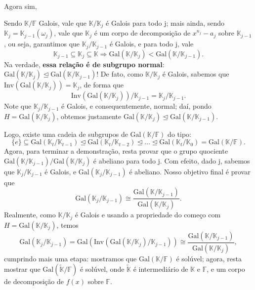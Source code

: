 \documentclass[../algebraIII_notes.tex]{subfiles}
\begin{document}
Agora sim,
\begin{proof*}[Teorema]
	Sendo \(\mathbb{K}/\mathbb{F}\) Galois, vale que \(\mathbb{K}/\mathbb{K}_{j}\) é Galois para todo j; mais ainda, sendo \(\mathbb{K}_{j}=\mathbb{K}_{j-1}(\omega_{j})\), vale que \(\mathbb{K}_{j}\) é um corpo de decomposição de \(x^{n_{j}}-a_{j}\) sobre \(\mathbb{K}_{j-1}\), ou seja, garantimos que \(\mathbb{K}_{j}/\mathbb{K}_{j-1}\) é Galois, e para todo j, vale
	\[
		\mathbb{K}_{j-1}\subseteq \mathbb{K}_{j}\subseteq \mathbb{K}\Rightarrow \mathrm{Gal}(\mathbb{K}/\mathbb{K}_{j})<\mathrm{Gal}(\mathbb{K}/\mathbb{K}_{j-1}).
	\]
	Na verdade, \textbf{essa relação é de subgrupo normal}: \(\mathrm{Gal}(\mathbb{K}/\mathbb{K}_{j})\trianglelefteq \mathrm{Gal}(\mathbb{K}/\mathbb{K}_{j-1})\)! De fato, como \(\mathbb{K}/\mathbb{K}_{j}\) é Galois, sabemos que \(\mathrm{Inv}(\mathrm{Gal}(\mathbb{K}/\mathbb{K}_{j}))=\mathbb{K}_{j}\), de forma que
	\[
		\mathrm{Inv}(\mathrm{Gal}(\mathbb{K}/\mathbb{K}_{j}))/\mathbb{K}_{j-1} = \mathbb{K}_{j}/\mathbb{K}_{j-1}.
	\]
	Note que \(\mathbb{K}_{j}/\mathbb{K}_{j-1}\) é Galois, e consequentemente, normal; daí, pondo \(H=\mathrm{Gal}(\mathbb{K}/\mathbb{K}_{j})\), obtemos justamente \(\mathrm{Gal}(\mathbb{K}/\mathbb{K}_{j})\trianglelefteq \mathrm{Gal}(\mathbb{K}/\mathbb{K}_{j-1}).\)

	Logo, existe uma cadeia de subgrupos de \(\mathrm{Gal}(\mathbb{K}/\mathbb{F})\) do tipo:
	\[
		\{e\}\subseteq \mathrm{Gal}(\mathbb{K}_{t}/\mathbb{K}_{t-1})\trianglelefteq \mathrm{Gal}(\mathbb{K}_{t}/\mathbb{K}_{t-2})\trianglelefteq \dotsc \trianglelefteq \mathrm{Gal}(\mathbb{K}_{t}/\mathbb{K}_{0}) = \mathrm{Gal}(\mathbb{K}/\mathbb{F}).
	\]
	Agora, para terminar a demonstração, resta provar que o grupo quociente\linebreak \(\mathrm{Gal}(\mathbb{K}/\mathbb{K}_{j-1})/\mathrm{Gal}(\mathbb{K}/\mathbb{K}_{j})\) é abeliano para todo j. Com efeito, dado j, sabemos que \(\mathbb{K}_{j}/\mathbb{K}_{j-1}\) é Galois, e \(\mathrm{Gal}(\mathbb{K}_{j}/\mathbb{K}_{j-1})\) é abeliano.
	Nosso objetivo final é provar que
	\[
		\mathrm{Gal}(\mathbb{K}_{j}/\mathbb{K}_{j-1})\cong \frac{\mathrm{Gal}(\mathbb{K}/\mathbb{K}_{j-1})}{\mathrm{Gal}(\mathbb{K}/\mathbb{K}_{j})}.
	\]
	Realmente, como \(\mathbb{K}/\mathbb{K}_{j}\) é Galois e usando a propriedade do começo com \(H = \mathrm{Gal}(\mathbb{K}/\mathbb{K}_{j})\), temos
	\[
		\mathrm{Gal}(\mathbb{K}_{j}/\mathbb{K}_{j-1})=\mathrm{Gal}(\mathrm{Inv}(\mathrm{Gal}(\mathbb{K}/\mathbb{K}_{j})/\mathbb{K}_{j-1}))\cong \frac{\mathrm{Gal}(\mathbb{K}/\mathbb{K}_{j-1})}{\mathrm{Gal}(\mathbb{K}/\mathbb{K}_{j})},
	\]
	cumprindo mais uma etapa: mostramos que \(\mathrm{Gal}(\mathbb{K}/\mathbb{F})\) é solúvel; agora, resta mostrar que \(\mathrm{Gal}(\tilde{\mathbb{K}}/\mathbb{F})\) é solúvel, onde \(\tilde{\mathbb{K}}\) é intermediário de \(\mathbb{K}\) e \(\mathbb{F}\), e um corpo de decomposição de \(f(x)\) sobre \(\mathbb{F}.\)


\end{proof*}
\end{document}

